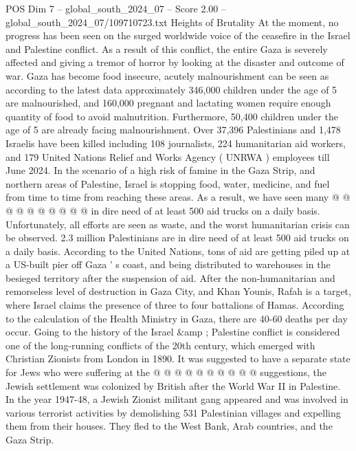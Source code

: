 \begin{textsample}{POS Dim 7 – global\_south\_2024\_07 – Score 2.00 – global\_south\_2024\_07/109710723.txt}  \label{ex:f7_pos_114}
Heights of Brutality At the moment, no progress has been seen on the surged worldwide voice of the ceasefire in the Israel and Palestine conflict.
As a result of this conflict, the entire Gaza is severely affected and giving a tremor of horror by looking at the disaster and outcome of war.
Gaza has become food insecure, acutely malnourishment can be seen as according to the latest data approximately 346,000 children under the age of 5 are malnourished, and 160,000 pregnant and lactating women require enough quantity of food to avoid malnutrition.
Furthermore, 50,400 children under the age of 5 are already facing malnourishment.
Over 37,396 Palestinians and 1,478 Israelis have been killed including 108 journalists, 224 humanitarian aid workers, and 179 United Nations Relief and Works Agency ( UNRWA ) employees till June 2024.
In the scenario of a high risk of famine in the Gaza Strip, and northern areas of Palestine, Israel is stopping food, water, medicine, and fuel from time to time from reaching these areas.
As a result, we have seen many @ @ @ @ @ @ @ @ @ @ in dire need of at least 500 aid trucks on a daily basis.
Unfortunately, all efforts are seen as waste, and the worst humanitarian crisis can be observed. 2.3 million Palestinians are in dire need of at least 500 aid trucks on a daily basis.
According to the United Nations, tons of aid are getting piled up at a US-built pier off Gaza ' s coast, and being distributed to warehouses in the besieged territory after the suspension of aid.
After the non-humanitarian and remorseless level of destruction in Gaza City, and Khan Younis, Rafah is a target, where Israel claims the presence of three to four battalions of Hamas.
According to the calculation of the Health Ministry in Gaza, there are 40-60 deaths per day occur.
Going to the history of the Israel \&amp ; Palestine conflict is considered one of the long-running conflicts of the 20th century, which emerged with Christian Zionists from London in 1890.
It was suggested to have a separate state for Jews who were suffering at the @ @ @ @ @ @ @ @ @ @ suggestions, the Jewish settlement was colonized by British after the World War II in Palestine.
In the year 1947-48, a Jewish Zionist militant gang appeared and was involved in various terrorist activities by demolishing 531 Palestinian villages and expelling them from their houses.
They fled to the West Bank, Arab countries, and the Gaza Strip.

\end{textsample}
